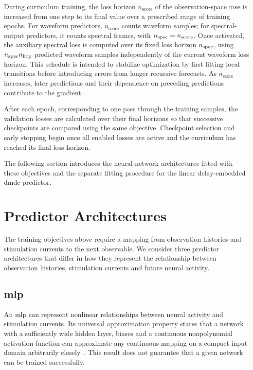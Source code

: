 During curriculum training, the loss horizon $n_{\mathrm{score}}$ of the observation-space \ac{mse} is increased from one step to its final value over a prescribed range of training epochs.
For waveform predictors, $n_{\mathrm{score}}$ counts waveform samples; for spectral-output predictors, it counts spectral frames, with $n_{\mathrm{spec}}=n_{\mathrm{score}}$.
Once activated, the auxiliary spectral loss is computed over its fixed loss horizon $n_{\mathrm{spec}}$, using $n_{\mathrm{spec}}n_{\mathrm{hop}}{}$ predicted waveform samples independently of the current waveform loss horizon.
This schedule is intended to stabilize optimization by first fitting local transitions before introducing errors from longer recursive forecasts.
As $n_{\mathrm{score}}$ increases, later predictions and their dependence on preceding predictions contribute to the gradient.

After each epoch, corresponding to one pass through the training samples, the validation losses are calculated over their final horizons so that successive checkpoints are compared using the same objective.
Checkpoint selection and early stopping begin once all enabled losses are active and the curriculum has reached its final loss horizon.

The following section introduces the neural-network architectures fitted with these objectives and the separate fitting procedure for the linear delay-embedded \ac{dmdc} predictor.

\section{Predictor Architectures}\label{sec:predictor_architectures}

The training objectives above require a mapping from observation histories and stimulation currents to the next observable.
We consider three predictor architectures that differ in how they represent the relationship between observation histories, stimulation currents and future neural activity.

\subsection{\acs{mlp}}

An \ac{mlp} can represent nonlinear relationships between neural activity and stimulation currents.
Its universal approximation property states that a network with a sufficiently wide hidden layer, biases and a continuous nonpolynomial activation function can approximate any continuous mapping on a compact input domain arbitrarily closely~\cite{Leshno1993}.
This result does not guarantee that a given network can be trained successfully.

